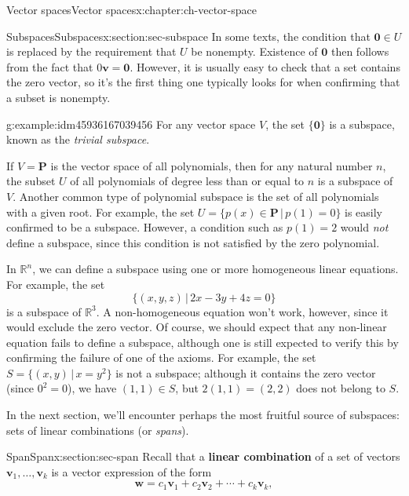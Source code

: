 \documentclass[oneside,10pt,]{book}
\newcommand{\terminology}[1]{\textbf{#1}}
\numberwithin{equation}{section}
\newcommand{\R}{\mathbb{R}}
\newcommand{\vv}{\mathbf{v}}
\newcommand{\ww}{\mathbf{w}}
\newcommand{\zer}{\mathbf{0}}
\begin{document}
\begin{chapterptx}{Vector spaces}{}{Vector spaces}{}{}{x:chapter:ch-vector-space}
\begin{sectionptx}{Subspaces}{}{Subspaces}{}{}{x:section:sec-subspace}
In some texts, the condition that \(\zer\in U\) is replaced by the requirement that \(U\) be nonempty. Existence of \(\zer\) then follows from the fact that \(0\vv=\zer\). However, it is usually easy to check that a set contains the zero vector, so it's the first thing one typically looks for when confirming that a subset is nonempty.%
\begin{example}{}{g:example:idm45936167039456}%
For any vector space \(V\), the set \(\{\zer\}\) is a subspace, known as the \emph{trivial subspace}.%
\par
If \(V=\mathbf{P}\) is the vector space of all polynomials, then for any natural number \(n\), the subset \(U\) of all polynomials of degree less than or equal to \(n\) is a subspace of \(V\). Another common type of polynomial subspace is the set of all polynomials with a given root. For example, the set \(U=\{p(x)\in\mathbf{P}\,|\,p(1)=0\}\) is easily confirmed to be a subspace. However, a condition such as \(p(1)=2\) would \emph{not} define a subspace, since this condition is not satisfied by the zero polynomial.%
\par
In \(\R^n\), we can define a subspace using one or more homogeneous linear equations. For example, the set%
\begin{equation*}
\{(x,y,z)\,|\, 2x-3y+4z=0\}
\end{equation*}
is a subspace of \(\R^3\). A non-homogeneous equation won't work, however, since it would exclude the zero vector. Of course, we should expect that any non-linear equation fails to define a subspace, although one is still expected to verify this by confirming the failure of one of the axioms. For example, the set \(S=\{(x,y)\,|\,x=y^2\}\) is not a subspace; although it contains the zero vector (since \(0^2=0\)), we have \((1,1)\in S\), but \(2(1,1)=(2,2)\) does not belong to \(S\).%
\end{example}
In the next section, we'll encounter perhaps the most fruitful source of subspaces: sets of linear combinations (or \emph{spans}).%
\end{sectionptx}
%
%
\typeout{************************************************}
\typeout{************************************************}
%
\begin{sectionptx}{Span}{}{Span}{}{}{x:section:sec-span}
Recall that a \terminology{linear combination} of a set of vectors \(\vv_1,\ldots, \vv_k\) is a vector expression of the form%
\begin{equation*}
\ww=c_1\vv_1+c_2\vv_2+\cdots +c_k\vv_k,
\end{equation*}

\end{sectionptx}
\end{chapterptx}
\end{document}
